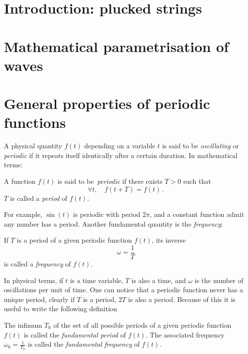\section{Introduction: plucked strings}
\section{Mathematical parametrisation of waves}
\section{General properties of periodic functions}
A physical quantity $f(t)$ depending on a variable $t$ is said to be \emph{oscillating} or
\emph{periodic} if it repeats itself identically after a certain duration. In mathematical
terms:
\begin{definition}
  A function $f(t)$ is said to be~\emph{periodic} if there exists $T>0$ such that
  \begin{equation}
    \forall t,\quad f(t+T)=f(t)\,.
  \end{equation}
  $T$ is called a \emph{period} of $f(t)$.
\end{definition}
\noindent For example, $\sin(t)$ is periodic with period $2\pi$, and a constant function
admit any number has a period. Another fundamental quantity is the \emph{frequency}:
\begin{definition}
  If $T$ is a period of a given periodic function $f(t)$, its inverse
  \begin{equation}
    \omega=\frac{1}{T}
  \end{equation}
  is called a \emph{frequency} of $f(t)$.
\end{definition}
\noindent In physical terms, if $t$ is a time variable, $T$ is also a time, and $\omega$
is the number of oscillations per unit of time. One can notice that a periodic function
never has a unique period, \eg clearly if $T$ is a period, $2T$ is also a period. Because
of this it is useful to write the following definition
\begin{definition}
  The infimum $T_0$ of the set of all possible periods of a given periodic function $f(t)$
  is called the \emph{fundamental period} of $f(t)$. The associated frequency
  $\omega_0=\frac{1}{T_0}$ is called the \emph{fundamental frequency} of $f(t)$.
\end{definition}
